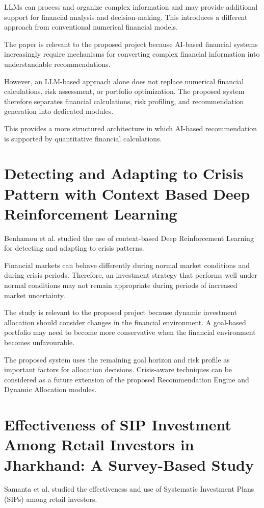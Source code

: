 LLMs can process and organize complex information and may provide additional support for financial analysis and decision-making. This introduces a different approach from conventional numerical financial models.

The paper is relevant to the proposed project because AI-based financial systems increasingly require mechanisms for converting complex financial information into understandable recommendations.

However, an LLM-based approach alone does not replace numerical financial calculations, risk assessment, or portfolio optimization. The proposed system therefore separates financial calculations, risk profiling, and recommendation generation into dedicated modules.

This provides a more structured architecture in which AI-based recommendation is supported by quantitative financial calculations.

\section{Detecting and Adapting to Crisis Pattern with Context Based Deep Reinforcement Learning}
Benhamou et al. studied the use of context-based Deep Reinforcement Learning for detecting and adapting to crisis patterns.

Financial markets can behave differently during normal market conditions and during crisis periods. Therefore, an investment strategy that performs well under normal conditions may not remain appropriate during periods of increased market uncertainty.

The study is relevant to the proposed project because dynamic investment allocation should consider changes in the financial environment. A goal-based portfolio may need to become more conservative when the financial environment becomes unfavourable.

The proposed system uses the remaining goal horizon and risk profile as important factors for allocation decisions. Crisis-aware techniques can be considered as a future extension of the proposed Recommendation Engine and Dynamic Allocation modules.

\section{Effectiveness of SIP Investment Among Retail Investors in Jharkhand: A Survey-Based Study}
Samanta et al. studied the effectiveness and use of Systematic Investment Plans (SIPs) among retail investors.

